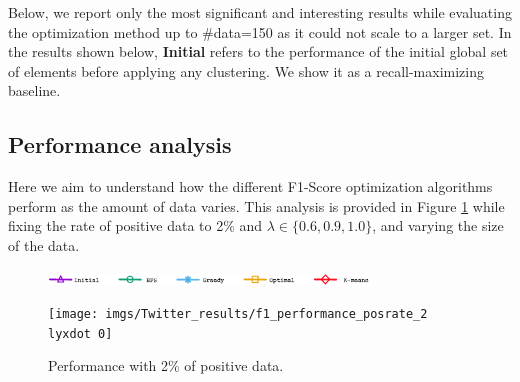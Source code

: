 Below, we report only the most significant and interesting results while evaluating the optimization method up to \#data=150 as it could not scale to a larger set. In the results shown below, {\bf Initial} refers to the performance of the initial global set of elements before applying any clustering.  We show it as a recall-maximizing baseline.




\subsection{Performance analysis}



 Here we aim to understand how the different F1-Score optimization algorithms perform as the amount of data varies.  This analysis is provided in Figure  \ref{fig:F1_vs_Data_Twitter} while fixing the rate of positive data to 2\% and $\lambda \in \{0.6,0.9,1.0\}$, and  varying the size of the data.






\begin{figure}[H]
\begin{centering}
\includegraphics[width=8.5cm]{imgs/legend1}
\par\end{centering}
\begin{centering}
{\texttt{[image: imgs/Twitter\_results/f1\_performance\_posrate\_2\\lyxdot 0]}}
\par\end{centering}
\caption{Performance with 2\% of positive data.}
\label{fig:F1_vs_Data_Twitter}
\end{figure}




